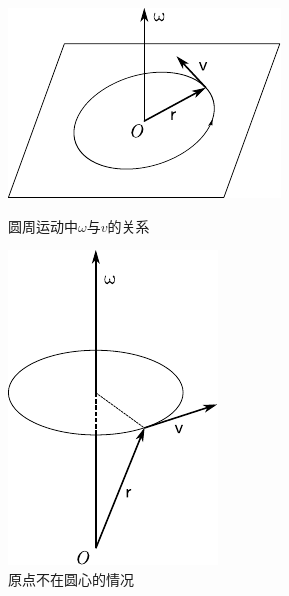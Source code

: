 \begin{figure}[!h]
    \small
    \begin{minipage}[b]{15em}
        \centering
        \includegraphics{figure/fig01.20}
        \vspace{4em}
        \caption{圆周运动中$\omega$与$v$的关系}
        \label{fig:01.20}
    \end{minipage}
    \hfill
    \begin{minipage}[b]{13em}
        \centering
        \includegraphics{figure/fig01.21}
        \vspace{1em}
        \caption{原点不在圆心的情况}
        \label{fig:01.21}
\end{minipage}
\end{figure}

